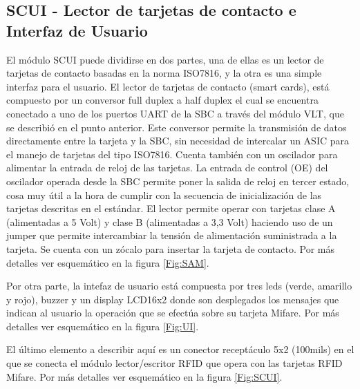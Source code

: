 \subsection{SCUI - Lector de tarjetas de contacto e Interfaz de Usuario}
El módulo SCUI puede dividirse en dos partes, una de ellas es un lector de tarjetas de contacto basadas en la norma ISO7816, y la otra es una simple interfaz para el usuario.
El lector de tarjetas de contacto (smart cards), está compuesto por un conversor full duplex a half duplex el cual se encuentra conectado a uno de los puertos UART de la SBC a través del módulo VLT, que se describió en el punto anterior. Este conversor permite la transmisión de datos directamente entre la tarjeta y la SBC, sin necesidad de intercalar un ASIC para el manejo de tarjetas del tipo ISO7816. Cuenta también con un oscilador para alimentar la entrada de reloj de las tarjetas. La entrada de control (OE) del oscilador operada desde la SBC permite poner la salida de reloj en tercer estado, cosa muy útil a la hora de cumplir con la secuencia de inicialización de las tarjetas descritas en el estándar. El lector permite operar con tarjetas clase A (alimentadas a 5 Volt) y clase B (alimentadas a 3,3 Volt) haciendo uso de un jumper que permite intercambiar la tensión de alimentación suministrada a la tarjeta. Se cuenta con un zócalo para insertar la tarjeta de contacto.
Por más detalles ver esquemático en la figura \ref{Fig:SAM}.

Por otra parte, la intefaz de usuario está compuesta por tres leds (verde, amarillo y rojo), buzzer y un display LCD16x2 donde son desplegados los mensajes que indican al usuario la operación que se efectúa sobre su tarjeta Mifare.
Por más detalles ver esquemático en la figura \ref{Fig:UI}.

El último elemento a describir aquí es un conector receptáculo 5x2 (100mils) en el que se conecta el módulo lector/escritor RFID que opera con las tarjetas RFID Mifare.
Por más detalles ver esquemático en la figura \ref{Fig:SCUI}.

